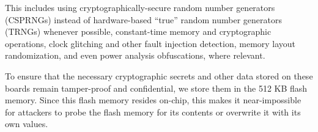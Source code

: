 \else
This includes using cryptographically-secure random number generators (CSPRNGs) instead of hardware-based ``true'' random number generators (TRNGs) whenever possible, constant-time memory and cryptographic operations, clock glitching and other fault injection detection, memory layout randomization, and even power analysis obfuscations, where relevant.

To ensure that the necessary cryptographic secrets and other data stored on these boards remain tamper-proof and confidential, we store them in the 512 KB flash memory. Since this flash memory resides on-chip, this makes it near-impossible for attackers to probe the flash memory for its contents or overwrite it with its own values. 
\fi

